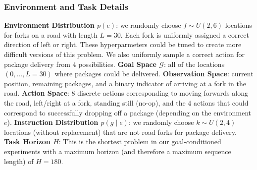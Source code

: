 \documentclass{article}
\begin{document}
\subsubsection{Environment and Task Details}
\textbf{Environment Distribution $p(e)$}: we randomly choose $f \sim U(2, 6)$ locations for forks on a road with length $L = 30$. Each fork is uniformly assigned a correct direction of left or right. These hyperparmeters could be tuned to create more difficult versions of this problem. We also uniformly sample a correct action for package delivery from $4$ possibilities.
\textbf{Goal Space $\mathcal{G}$}: all of the locations $(0, \dots, L=30)$ where packages could be delivered.
\textbf{Observation Space}: current position, remaining packages, and a binary indicator of arriving at a fork in the road.
\textbf{Action Space}: $8$ discrete actions corresponding to moving forwards along the road, left/right at a fork, standing still (no-op), and the $4$ actions that could correspond to successfully dropping off a package (depending on the environment $e$).
\textbf{Instruction Distribution $p(g \mid e)$}: we randomly choose $k \sim U(2, 4)$ locations (without replacement) that are not road forks for package delivery.
\textbf{Task Horizon $H$}: This is the shortest problem in our goal-conditioned experiments with a maximum horizon (and therefore a maximum sequence length) of $H = 180$.
\end{document}
